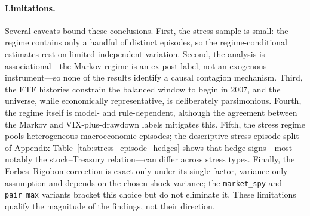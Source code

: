 \paragraph{Limitations.} Several caveats bound these conclusions. First, the stress sample is small: the regime contains only a handful of distinct episodes, so the regime-conditional estimates rest on limited independent variation. Second, the analysis is associational---the Markov regime is an ex-post label, not an exogenous instrument---so none of the results identify a causal contagion mechanism. Third, the ETF histories constrain the balanced window to begin in 2007, and the universe, while economically representative, is deliberately parsimonious. Fourth, the regime itself is model- and rule-dependent, although the agreement between the Markov and VIX-plus-drawdown labels mitigates this. Fifth, the stress regime pools heterogeneous macroeconomic episodes; the descriptive stress-episode split of Appendix Table~\ref{tab:stress_episode_hedges} shows that hedge signs---most notably the stock--Treasury relation---can differ across stress types. Finally, the Forbes--Rigobon correction is exact only under its single-factor, variance-only assumption and depends on the chosen shock variance; the \texttt{market\_spy} and \texttt{pair\_max} variants bracket this choice but do not eliminate it. These limitations qualify the magnitude of the findings, not their direction.
